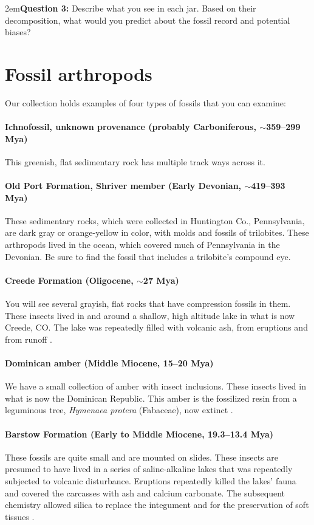\documentclass[letterpaper, 11pt]{article}
\begin{document}
\hangindent2em\textbf{Question 3:} Describe what you see in each jar. Based on their decomposition, what would you predict about the fossil record and potential biases?

\section{Fossil arthropods}
Our collection holds examples of four types of fossils that you can examine: 

\paragraph{Ichnofossil, unknown provenance (probably Carboniferous, $\sim$359--299 Mya)} This greenish, flat sedimentary rock has multiple track ways across it.

\paragraph{Old Port Formation, Shriver member (Early Devonian, $\sim$419--393 Mya)} These sedimentary rocks, which were collected in Huntington Co., Pennsylvania, are dark gray or orange-yellow in color, with molds and fossils of trilobites. These arthropods lived in the ocean, which covered much of Pennsylvania in the Devonian. Be sure to find the fossil that includes a trilobite's compound eye.

\paragraph{Creede Formation (Oligocene, $\sim$27 Mya)} You will see several grayish, flat rocks that have compression fossils in them. These insects lived in and around a shallow, high altitude lake in what is now Creede, CO. The lake was repeatedly filled with volcanic ash, from eruptions and from runoff \citep{berkeley}.

\paragraph{Dominican amber (Middle Miocene, 15--20 Mya)} We have a small collection of amber with insect inclusions. These insects lived in what is now the Dominican Republic. This amber is the fossilized resin from a leguminous tree, \textit{Hymenaea protera} (Fabaceae), now extinct \citep{IturraldeVinent1850}.

\paragraph{Barstow Formation (Early to Middle Miocene, 19.3--13.4 Mya)} These fossils are quite small and are mounted on slides. These insects are presumed to have lived in a series of saline-alkaline lakes that was repeatedly subjected to volcanic disturbance. Eruptions repeatedly killed the lakes' fauna and covered the carcasses with ash and calcium carbonate. The subsequent chemistry allowed silica to replace the integument and for the preservation of soft tissues \citep{PARK01042001}.\\
\end{document}
